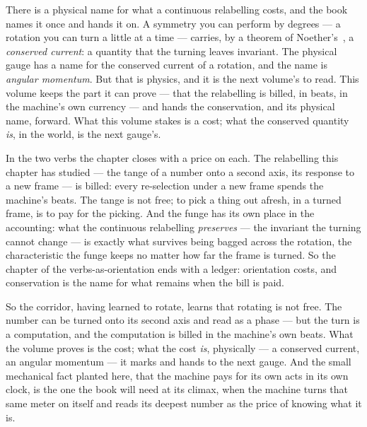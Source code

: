 There is a physical name for what a continuous relabelling costs, and the book names it once and hands it on. A
symmetry you can perform by degrees --- a rotation you can turn a little at a time --- carries, by a theorem of
Noether's~\cite{noether1918}, a \emph{conserved current}: a quantity that the turning leaves invariant. The physical
gauge has a name for the conserved current of a rotation, and the name is \emph{angular momentum}. But that is physics,
and it is the next volume's to read. This volume keeps the part it can prove --- that the relabelling is billed, in
beats, in the machine's own currency --- and hands the conservation, and its physical name, forward. What this volume
stakes is a cost; what the conserved quantity \emph{is}, in the world, is the next gauge's.

In the two verbs the chapter closes with a price on each. The relabelling this chapter has studied --- the tange of a
number onto a second axis, its response to a new frame --- is billed: every re-selection under a new frame spends the
machine's beats. The tange is not free; to pick a thing out afresh, in a turned frame, is to pay for the picking. And
the funge has its own place in the accounting: what the continuous relabelling \emph{preserves} --- the invariant the
turning cannot change --- is exactly what survives being bagged across the rotation, the characteristic the funge keeps
no matter how far the frame is turned. So the chapter of the verbs-as-orientation ends with a ledger: orientation
costs, and conservation is the name for what remains when the bill is paid.

So the corridor, having learned to rotate, learns that rotating is not free. The number can be turned onto its second
axis and read as a phase --- but the turn is a computation, and the computation is billed in the machine's own beats.
What the volume proves is the cost; what the cost \emph{is}, physically --- a conserved current, an angular momentum
--- it marks and hands to the next gauge. And the small mechanical fact planted here, that the machine pays for its own
acts in its own clock, is the one the book will need at its climax, when the machine turns that same meter on itself
and reads its deepest number as the price of knowing what it is.

